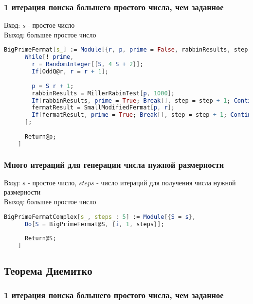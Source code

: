     \subsubsection{1 итерация поиска большего простого числа, чем заданное}

      Вход: {$s$} - простое число \\
      Выход: большее простое число

      \begin{lstlisting}[language=Mathematica,caption={
	Генерация с использованием малой модифицированной теоремы Ферма (1 итерация)
      }]
	BigPrimeFermat[s_] := Module[{r, p, prime = False, rabbinResults, step = 0, fermatResult, S = s},
	  While[! prime,
	    r = RandomInteger[{S, 4 S + 2}];
	    If[OddQ@r, r = r + 1];
	  
	    p = S r + 1;
	    rabbinResults = MillerRabinTest[p, 1000];
	    If[rabbinResults, prime = True; Break[], step = step + 1; Continue[]];
	    fermatResult = SmallModifiedFermat[p, r];
	    If[fermatResult, prime = True; Break[], step = step + 1; Continue[]];
	  ];
	  
	  Return@p;
	]
      \end{lstlisting}

    \subsubsection{Много итераций для генерации числа нужной размерности}
    
      Вход: {$s$} - простое число, {$steps$} - число итераций для получения числа нужной размерности \\
      Выход: большее простое число
  
      \begin{lstlisting}[language=Mathematica,caption={
	Генерация с использованием малой модифицированной теоремы Ферма (много итераций)
      }]
	BigPrimeFermatComplex[s_, steps_: 5] := Module[{S = s},
	  Do[S = BigPrimeFermat@S, {i, 1, steps}];
  
	  Return@S;
	]
      \end{lstlisting}

  \subsection{Теорема Диемитко}

    \subsubsection{1 итерация поиска большего простого числа, чем заданное}

